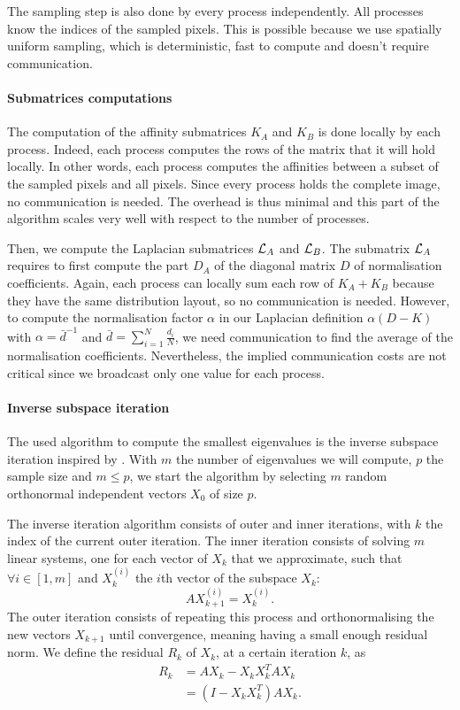 The sampling step is also done by every process independently.
All processes know the indices of the sampled pixels.
This is possible because we use spatially uniform sampling, which is deterministic, fast to compute and doesn't require communication.

\paragraph{Submatrices computations}
The computation of the affinity submatrices \(K_A\) and \(K_B\) is done locally by each process.
Indeed, each process computes the rows of the matrix that it will hold locally.
In other words, each process computes the affinities between a subset of the sampled pixels and all pixels.
Since every process holds the complete image, no communication is needed.
The overhead is thus minimal and this part of the algorithm scales very well with respect to the number of processes.

Then, we compute the Laplacian submatrices \(\operatorname{\mathcal{L}}_A\) and \(\operatorname{\mathcal{L}}_B\).
The submatrix \(\operatorname{\mathcal{L}}_A\) requires to first compute the part \(D_A\) of the diagonal matrix \(D\) of normalisation coefficients.
Again, each process can locally sum each row of \(K_A + K_B\) because they have the same distribution layout, so no communication is needed.
However, to compute the normalisation factor \(\alpha\) in our Laplacian definition \(\alpha (D - K)\) with \(\alpha = \bar{d}^{-1}\) and \(\bar{d} = \sum^N_{i=1} \frac{d_i}{N}\), we need communication to find the average of the normalisation coefficients.
Nevertheless, the implied communication costs are not critical since we broadcast only one value for each process.

\paragraph{Inverse subspace iteration}
The used algorithm to compute the smallest eigenvalues is the inverse subspace iteration inspired by \cite{el_khoury_acceleration_2014}.
With \(m\) the number of eigenvalues we will compute, \(p\) the sample size and \(m \le p\), we start the algorithm by selecting \(m\) random orthonormal independent vectors \(X_0\) of size \(p\).

The inverse iteration algorithm consists of outer and inner iterations, with \(k\) the index of the current outer iteration.
The inner iteration consists of solving \(m\) linear systems, one for each vector of \(X_k\) that we approximate, such that \(\forall i \in [1, m]\) and \(X_k^{(i)}\) the \(i\)th vector of the subspace \(X_k\):
\[A X_{k+1}^{(i)} = X_k^{(i)}.\]
The outer iteration consists of repeating this process and orthonormalising the new vectors \(X_{k+1}\) until convergence, meaning having a small enough residual norm.
We define the residual \(R_k\) of \(X_k\), at a certain iteration \(k\), as
\begin{equation}
 \begin{split}
  R_k & = A X_k - X_k X_k^T A X_k \\
      & = (I - X_k X_k^T) A X_k.
 \end{split}
\end{equation}

